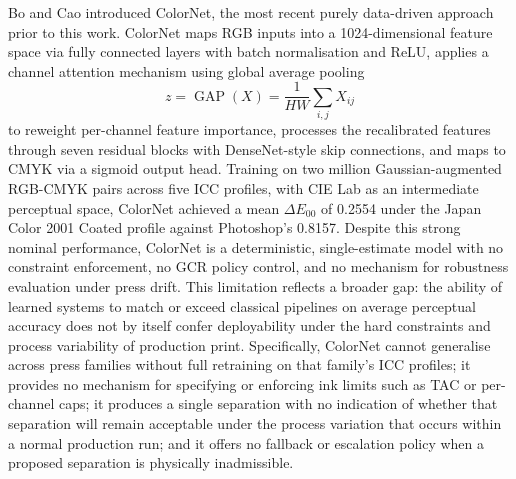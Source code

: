 \documentclass[acmsmall,screen,nonacm]{acmart}
\begin{document}
Bo and Cao \cite{bo} introduced ColorNet, the most recent purely data-driven approach prior to this work. ColorNet maps RGB inputs into a 1024-dimensional feature space via fully connected layers with batch normalisation and ReLU, applies a channel attention mechanism using global average pooling
\[
z = \operatorname{GAP}(X) = \frac{1}{HW}\sum_{i,j} X_{ij}
\]
to reweight per-channel feature importance, processes the recalibrated features through seven residual blocks with DenseNet-style skip connections, and maps to CMYK via a sigmoid output head. Training on two million Gaussian-augmented RGB-CMYK pairs across five ICC profiles, with CIE Lab as an intermediate perceptual space, ColorNet achieved a mean $\Delta E_{00}$ of 0.2554 under the Japan Color 2001 Coated profile against Photoshop's 0.8157. Despite this strong nominal performance, ColorNet is a deterministic, single-estimate model with no constraint enforcement, no GCR policy control, and no mechanism for robustness evaluation under press drift. This limitation reflects a broader gap: the ability of learned systems to match or exceed classical pipelines on average perceptual accuracy does not by itself confer deployability under the hard constraints and process variability of production print. Specifically, ColorNet cannot generalise across press families without full retraining on that family's ICC profiles; it provides no mechanism for specifying or enforcing ink limits such as TAC or per-channel caps; it produces a single separation with no indication of whether that separation will remain acceptable under the process variation that occurs within a normal production run; and it offers no fallback or escalation policy when a proposed separation is physically inadmissible.
\end{document}
